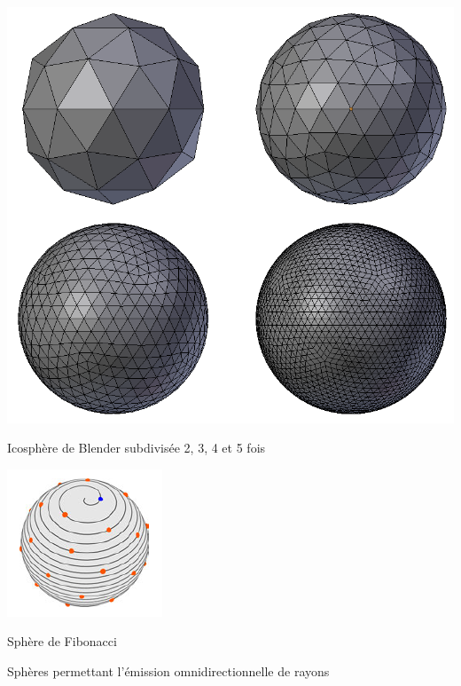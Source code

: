 \begin{figureth}
	\begin{subfigureth}{0.45\textwidth}
		\includegraphics[width=\linewidth]{images/icosphere}
		\caption{Icosphère de Blender subdivisée 2, 3, 4 et 5 fois}
		\label{icosphere}
	\end{subfigureth}
	\qquad
	\begin{subfigureth}{0.45\textwidth}
		\includegraphics[width=\linewidth]{images/fibonacci}
		\caption[Sphère de Fibonacci]{Sphère de Fibonacci \footnotemark}
		\label{fibonacci}
	\end{subfigureth}
	\caption{Sphères permettant l'émission omnidirectionnelle de rayons}

\end{figureth}

